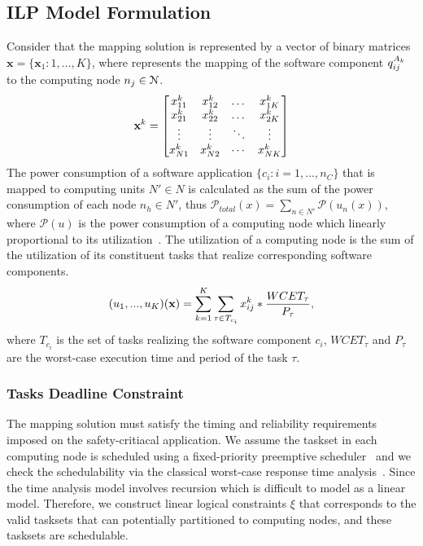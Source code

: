 \subsection{ILP Model Formulation}
Consider that the mapping solution is represented by a vector of binary matrices $\textbf{x}=\{\textbf{x}_1:1,...,K\}$, where \ttxkij represents the mapping of the software component $\sss{q}[k][ij]$ to the computing node $\ssb{n}[j]\in \mathcal{N}$. 
\begin{equation}
\label{eqn_solution}
\bspx{k}=
\begin{bmatrix} 
\ssx{k}{11} & \ssx{k}{12} & \dots & \ssx{k}{1K}\\
\ssx{k}{21} & \ssx{k}{22} & \dots & \ssx{k}{2K}\\
\vdots & \vdots & \ddots & \vdots\\
\ssx{k}{N1} & \ssx{k}{N2} & \cdots & \ssx{k}{NK}
\end{bmatrix}
\end{equation}
The power consumption of a software application $\{c_i:i=1,...,n_C\}$ that is mapped to computing units $N'\in N$ is calculated as the sum of the power consumption of each node $n_h\in N'$, thus $\mathcal{P}_{total}(x)=\sum_{n\in N'}{\mathcal{P}(u_n(x))}$, where $\mathcal{P}(u)$ is the power consumption of a computing node which linearly proportional to its utilization~\cite{Mahmud5222}. The utilization of a computing node is the sum of the utilization of its constituent tasks that realize corresponding software components.
\begin{align}
	(u_1,...,u_K)(\textbf{x})=\sum_{k=1}^{K}\sum_{\tau\in T_{c_i}}{x^{k}_{ij}*\frac{WCET_\tau}{P_\tau}},
\end{align}
where $T_{c_i}$ is the set of tasks realizing the software component $c_i$, $WCET_\tau$ and $P_\tau$ are the worst-case execution time and  period of the task $\tau$.

\subsubsection{Tasks Deadline Constraint}
The mapping solution must satisfy the timing and reliability requirements imposed on the safety-critiacal application. We assume the taskset in each computing node is scheduled using a fixed-priority preemptive scheduler~\cite{Sha2004RealPerspective} and we check the schedulability via the classical worst-case response time analysis~\cite{Baruah2011Response-timeSystems}. Since the time analysis model involves recursion which is difficult to model as a linear model. Therefore, we construct linear logical constraints $\xi$ that corresponds to the valid tasksets that can potentially partitioned to computing nodes, and these tasksets are schedulable.

